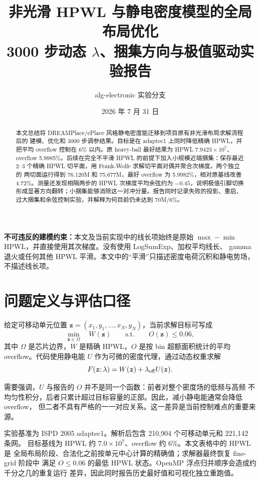 \documentclass[UTF8,fontset=windows,a4paper,11pt]{ctexart}
\title{\textbf{非光滑 HPWL 与静电密度模型的全局布局优化}\\
\large 3000 步动态 $\lambda$、捆集方向与极值驱动实验报告}
\author{alg-electronic 实验分支}
\date{2026 年 7 月 31 日}
\begin{document}
\maketitle

\begin{center}
\colorbox{soft}{\parbox{0.92\textwidth}{
\textbf{不可违反的建模约束：}本文及当前实现中的线长项始终是原始
$\max-\min$ HPWL，并直接使用其次梯度。没有使用 LogSumExp、加权平均线长、
gamma 退火或任何其他 HPWL 平滑。本文中的``平滑''只描述密度电荷沉积和静电势场，
不描述线长项。}}
\end{center}

\begin{abstract}
本文总结将 DREAMPlace/ePlace 风格静电密度能迁移到项目原有非光滑布局求解流程后的
建模、优化和 3000 步调参结果。目标是在 adaptec1 上同时降低精确 HPWL，并把平均
overflow 控制在 6\% 以内。原 heavy-ball 最好结果为 HPWL $7.9423\times 10^7$、
overflow 5.9985\%。后续在完全不平滑 HPWL 的前提下加入小规模近端捆集：保存最近
2--3 个精确 HPWL 切平面，用 Frank-Wolfe 求解切平面对偶并聚合次梯度。两个独立的
两切面运行得到 76.120M 和 75.677M，最好 overflow 为 5.9982\%，相对原基线改善
4.72\%。测量还发现相隔两步的 HPWL 次梯度平均余弦约为 $-0.45$，说明极值引脚切换
形成显著方向翻转；小捆集能够消除这一对冲分量。报告同时记录失败的投影、重启、
过大捆集和余弦控制实验，并解释为何目前仍未达到 70M/6\%。
\end{abstract}

\section{问题定义与评估口径}

给定可移动单元位置 $\bm z=(x_1,y_1,\ldots,x_N,y_N)$，当前求解目标可写成
\begin{equation}
  \min_{\bm z\in\Omega}\quad W(\bm z)
  \qquad \text{s.t.}\qquad O(\bm z)\leq 0.06,
\end{equation}
其中 $\Omega$ 是芯片边界，$W$ 是精确 HPWL，$O$ 是按 bin 超额面积统计的平均
overflow。代码使用静电能 $U$ 作为可微的密度代理，通过动态权重求解
\begin{equation}
  F(\bm z;\lambda)=W(\bm z)+\lambda_{\rm eff}U(\bm z).
\end{equation}

需要强调，$U$ 与报告的 $O$ 并不是同一个函数：前者对整个密度场的低频与高频
不均匀性积分，后者只累计超过目标容量的正部。因此，减小静电能通常会降低 overflow，
但二者不具有严格的一一对应关系。这一差异是当前控制难点的重要来源。

实验基准为 ISPD 2005 adaptec1。解析后包含 210,904 个可移动单元和 221,142 条网。
目标基线为 HPWL 约 $7.0\times 10^7$、overflow 约 6\%。本文表格中的 HPWL 是
全局布局阶段、合法化之前按单元中心计算的精确值；求解器最终恢复 fine-grid 阶段中
满足 $O\leq 0.06$ 的最低 HPWL 状态。OpenMP 浮点归并顺序会造成约千分之几的重复运行
差异，因此同时报告历史最好值和可视化独立重跑值。
\end{document}
